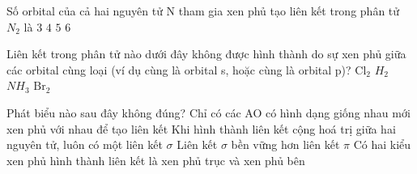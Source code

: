 	\begin{ex}
		Số orbital của cả hai nguyên tử N tham gia xen phủ tạo liên kết trong phân tử $N_2$ là
		\choice
		{\True $3$}
		{$4$}
		{$5$}
		{$6$}
		\loigiai{}
	\end{ex}
	
	\begin{ex}
		Liên kết trong phân tử nào dưới đây không được hình thành do sự xen phủ giữa các orbital cùng loại (ví dụ cùng là orbital s, hoặc cùng là orbital p)?
		\choice
		{$\mathrm{Cl}_2$}
		{$H_2$}
		{\True $NH_3$}
		{$\mathrm{Br}_2$}
		\loigiai{}
	\end{ex}
	
	\begin{ex}
		Phát biểu nào sau đây không đúng?
		\choice
		{\True Chỉ có các AO có hình dạng giống nhau mới xen phủ với nhau để tạo liên kết}
		{Khi hình thành liên kết cộng hoá trị giữa hai nguyên tử, luôn có một liên kết $\sigma$}
		{Liên kết $\sigma$ bền vững hơn liên kết $\pi$}
		{Có hai kiểu xen phủ hình thành liên kết là xen phủ trục và xen phủ bên}
		\loigiai{}
	\end{ex}
	
